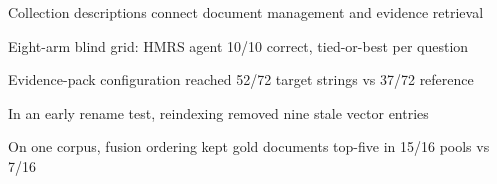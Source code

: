 \begin{highlights}
\item Collection descriptions connect document management and evidence retrieval
\item Eight-arm blind grid: HMRS agent 10/10 correct, tied-or-best per question
\item Evidence-pack configuration reached 52/72 target strings vs 37/72 reference
\item In an early rename test, reindexing removed nine stale vector entries
\item On one corpus, fusion ordering kept gold documents top-five in 15/16 pools vs 7/16
\end{highlights}
